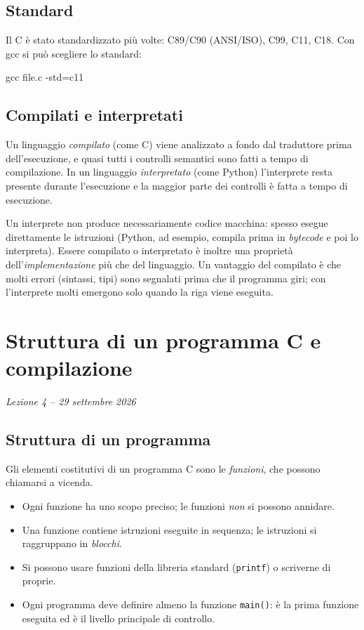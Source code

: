 \documentclass[11pt,a4paper]{article}
\begin{document}
\subsection{Standard}

Il C è stato standardizzato più volte: C89/C90 (ANSI/ISO), C99, C11, C18. Con
gcc si può scegliere lo standard:
\begin{comando}
gcc file.c -std=c11
\end{comando}

\subsection{Compilati e interpretati}

Un linguaggio \emph{compilato} (come C) viene analizzato a fondo dal traduttore
prima dell'esecuzione, e quasi tutti i controlli semantici sono fatti a tempo di
compilazione. In un linguaggio \emph{interpretato} (come Python) l'interprete
resta presente durante l'esecuzione e la maggior parte dei controlli è fatta a
tempo di esecuzione.

\begin{osservazione}
Un interprete non produce necessariamente codice macchina: spesso esegue direttamente le istruzioni (Python, ad esempio, compila prima in \emph{bytecode} e poi lo interpreta). Essere compilato o interpretato è inoltre una proprietà dell'\emph{implementazione} più che del linguaggio. Un vantaggio del compilato è che molti errori (sintassi, tipi) sono segnalati prima che il programma giri; con l'interprete molti emergono solo quando la riga viene eseguita.
\end{osservazione}

\section[Struttura di un programma C e compilazione (Lezione 4 -- 29 settembre 2026)]{Struttura di un programma C e compilazione}
\noindent\emph{Lezione 4 -- 29 settembre 2026}
\subsection{Struttura di un programma}

Gli elementi costitutivi di un programma C sono le \emph{funzioni}, che possono
chiamarsi a vicenda.
\begin{itemize}
    \item Ogni funzione ha uno scopo preciso; le funzioni \emph{non} si possono
          annidare.
    \item Una funzione contiene istruzioni eseguite in sequenza; le istruzioni
          si raggruppano in \emph{blocchi}.
    \item Si possono usare funzioni della libreria standard (\lstinline|printf|)
          o scriverne di proprie.
    \item Ogni programma deve definire almeno la funzione \lstinline|main()|:
          è la prima funzione eseguita ed è il livello principale di controllo.
\end{itemize}
\end{document}
